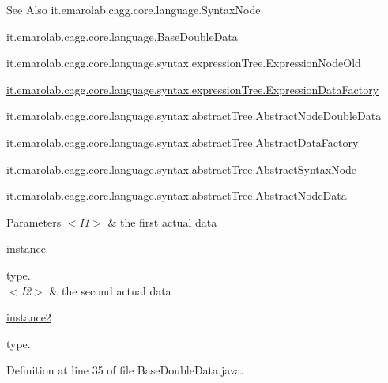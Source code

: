 \begin{DoxySeeAlso}{See Also}
it.\-emarolab.\-cagg.\-core.\-language.\-Syntax\-Node 

it.\-emarolab.\-cagg.\-core.\-language.\-Base\-Double\-Data 

it.\-emarolab.\-cagg.\-core.\-language.\-syntax.\-expression\-Tree.\-Expression\-Node\-Old 

\hyperlink{classit_1_1emarolab_1_1cagg_1_1core_1_1language_1_1syntax_1_1expressionTree_1_1ExpressionDataFactory}{it.\-emarolab.\-cagg.\-core.\-language.\-syntax.\-expression\-Tree.\-Expression\-Data\-Factory} 

it.\-emarolab.\-cagg.\-core.\-language.\-syntax.\-abstract\-Tree.\-Abstract\-Node\-Double\-Data 

\hyperlink{classit_1_1emarolab_1_1cagg_1_1core_1_1language_1_1syntax_1_1abstractTree_1_1AbstractDataFactory}{it.\-emarolab.\-cagg.\-core.\-language.\-syntax.\-abstract\-Tree.\-Abstract\-Data\-Factory} 

it.\-emarolab.\-cagg.\-core.\-language.\-syntax.\-abstract\-Tree.\-Abstract\-Syntax\-Node 

it.\-emarolab.\-cagg.\-core.\-language.\-syntax.\-abstract\-Tree.\-Abstract\-Node\-Data
\end{DoxySeeAlso}

\begin{DoxyParams}{Parameters}
{\em $<$\-I1$>$} & the first actual data
\begin{DoxyCode}
instance 
\end{DoxyCode}
 type. \\
\hline
{\em $<$\-I2$>$} & the second actual data
\begin{DoxyCode}
\hyperlink{classit_1_1emarolab_1_1cagg_1_1core_1_1language_1_1BaseDoubleData_3_01I1_00_01I2_01_4_abc041cee0a1cc9732753a909ff33bcf8}{instance2} 
\end{DoxyCode}
 type. \\
\hline
\end{DoxyParams}


Definition at line 35 of file Base\-Double\-Data.\-java.




